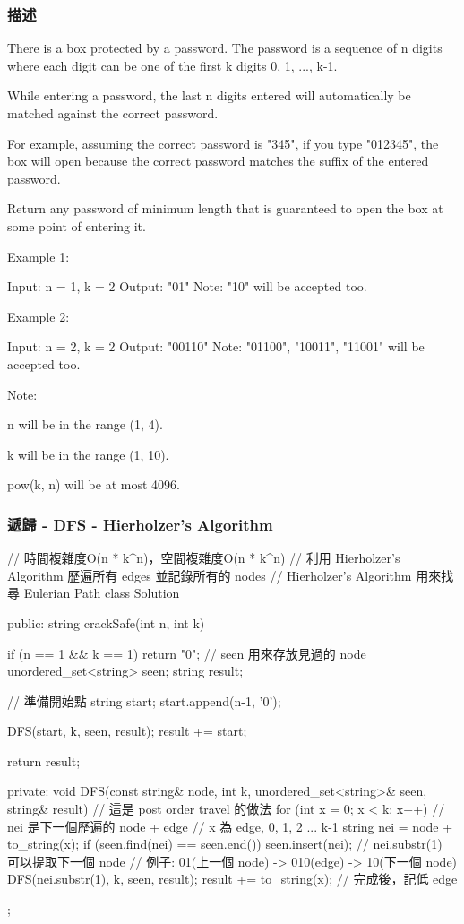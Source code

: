 \subsubsection{描述}
There is a box protected by a password. The password is a sequence of n digits where each digit can be one of the first k digits 0, 1, ..., k-1.

While entering a password, the last n digits entered will automatically be matched against the correct password.

For example, assuming the correct password is "345", if you type "012345", the box will open because the correct password matches the suffix of the entered password.

Return any password of minimum length that is guaranteed to open the box at some point of entering it.

Example 1:
\begin{Code}
Input: n = 1, k = 2
Output: "01"
Note: "10" will be accepted too.
\end{Code}

Example 2:
\begin{Code}
Input: n = 2, k = 2
Output: "00110"
Note: "01100", "10011", "11001" will be accepted too.
\end{Code}

Note:
\begindot
\item n will be in the range (1, 4).
\item k will be in the range (1, 10).
\item pow(k, n) will be at most 4096.
\myenddot

\subsubsection{遞歸 - DFS - Hierholzer's Algorithm}
\begin{Code}
// 時間複雜度O(n * k^n)，空間複雜度O(n * k^n)
// 利用 Hierholzer's Algorithm 歷遍所有 edges 並記錄所有的 nodes
// Hierholzer's Algorithm 用來找尋 Eulerian Path
class Solution {
public:
    string crackSafe(int n, int k) {
        if (n == 1 && k == 1) return "0";
        // seen 用來存放見過的 node
        unordered_set<string> seen;
        string result;

        // 準備開始點
        string start; start.append(n-1, '0');

        DFS(start, k, seen, result);
        result += start;

        return result;
    }
private:
    void DFS(const string& node, int k, unordered_set<string>& seen, string& result)
    {
        // 這是 post order travel 的做法
        for (int x = 0; x < k; x++)
        {
            // nei 是下一個歷遍的 node + edge
            // x 為 edge, 0, 1, 2 ... k-1
            string nei = node + to_string(x);
            if (seen.find(nei) == seen.end())
            {
                seen.insert(nei);
                // nei.substr(1) 可以提取下一個 node
                // 例子: 01(上一個 node) -> 010(edge) -> 10(下一個 node)
                DFS(nei.substr(1), k, seen, result);
                result += to_string(x); // 完成後，記低 edge
            }
        }
    }
};
\end{Code}

